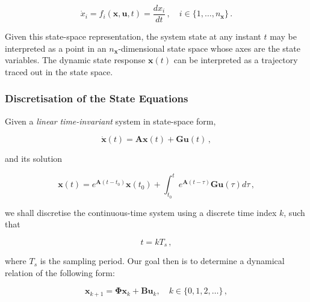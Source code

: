 \begin{equation}
  \dot{x}_i = f_i(\bm{x}, \bm{u}, t) = \frac{dx_i}{dt} \,, \quad i \in \{1, \dots, n_{\bm{x}}\}\,.
\end{equation}

\noindent
Given this state-space representation, the system state at any instant $t$ may be interpreted as a point in an $n_{\bm{x}}$-dimensional state space whose axes are the state variables. The dynamic state response $\bm{x}(t)$ can be interpreted as a trajectory traced out in the state space. 

\subsubsection{Discretisation of the State Equations}

Given a \emph{linear} \emph{time-invariant} system in state-space form, 

\begin{equation}\label{eq:linear_continuous}
  \dot{\bm{x}}(t) = \bm{A} \bm{x}(t) + \bm{G} \bm{u}(t)\,,
\end{equation}

\noindent
and its solution

\begin{equation}\label{eq:general_solution_system}
  \bm{x}(t) = e^{\bm{A}(t-t_0)} \bm{x}(t_0) +\int_{t_0}^t e^{\bm{A}(t - \tau)}\bm{G}\bm{u}(\tau)d\tau\,,
\end{equation}


\noindent
we shall discretise the continuous-time system using a discrete time index $k$, such that

\begin{equation}
  t = k T_s\,,
\end{equation}

\noindent
where $T_s$ is the sampling period. Our goal then is to determine a dynamical relation of the following form:

\begin{equation}\label{eq:discrete_plant_dynamics}
  \bm{x}_{k + 1} = \bm{\Phi} \bm{x}_k + \bm{B} \bm{u}_k, \quad k \in \{0, 1, 2, \dots\}\,,
\end{equation}


